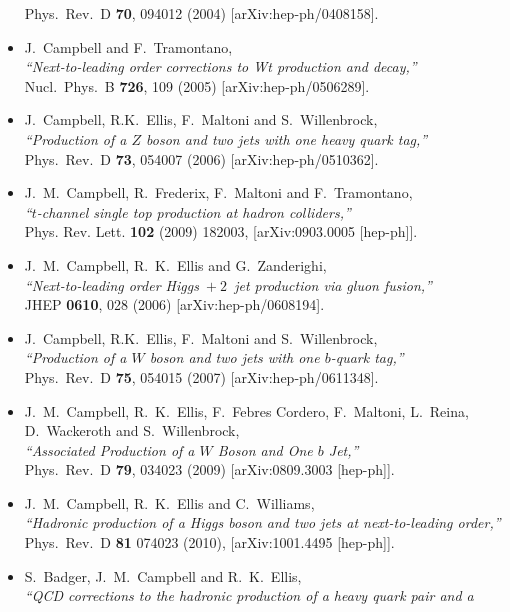 \documentclass[12pt]{article}
\begin{document}
\begin{itemize}
  Phys.\ Rev.\ D {\bf 70}, 094012 (2004)
  [arXiv:hep-ph/0408158].
\item J.~Campbell and F.~Tramontano, \\
  {\it ``Next-to-leading order corrections to Wt production and
  decay,''} \\
  Nucl.\ Phys.\ B {\bf 726}, 109 (2005)
  [arXiv:hep-ph/0506289].
\item J.~Campbell, R.K.~Ellis, F.~Maltoni and S.~Willenbrock, \\
  {\it ``Production of a $Z$ boson and two jets with one heavy
  quark tag,''} \\
  Phys.\ Rev.\ D {\bf 73}, 054007 (2006)
  [arXiv:hep-ph/0510362].
\item J.~M.~Campbell, R.~Frederix, F.~Maltoni and F.~Tramontano,\\
  {\it ``$t$-channel single top production at hadron colliders,''} \\ 
  Phys. Rev. Lett. {\bf 102} (2009) 182003,
  [arXiv:0903.0005 [hep-ph]].
\item J.~M.~Campbell, R.~K.~Ellis and G.~Zanderighi, \\
  {\it ``Next-to-leading order Higgs~$+~2$~jet production via
  gluon fusion,''} \\
  JHEP {\bf 0610}, 028 (2006)
  [arXiv:hep-ph/0608194].
\item J.~Campbell, R.K.~Ellis, F.~Maltoni and S.~Willenbrock, \\
  {\it ``Production of a $W$ boson and two jets with one $b$-quark
  tag,''} \\
  Phys.\ Rev.\ D {\bf 75}, 054015 (2007)
  [arXiv:hep-ph/0611348].
\item J.~M.~Campbell, R.~K.~Ellis, F.~Febres Cordero, F.~Maltoni, L.~Reina, D.~Wackeroth and S.~Willenbrock, \\
  {\it ``Associated Production of a $W$ Boson and One $b$ Jet,''} \\
  Phys.\ Rev.\  D {\bf 79}, 034023 (2009)
  [arXiv:0809.3003 [hep-ph]].
\item J.~M.~Campbell, R.~K.~Ellis and C.~Williams, \\
  {\it ``Hadronic production of a Higgs boson and two jets at next-to-leading
  order,''} \\
   Phys.\ Rev.\ D {\bf 81} 074023 (2010),
  [arXiv:1001.4495 [hep-ph]].
\item S.~Badger, J.~M.~Campbell and R.~K.~Ellis, \\
  {\it ``QCD corrections to the hadronic production of a heavy quark pair and a
}
\end{itemize}
\end{document}
